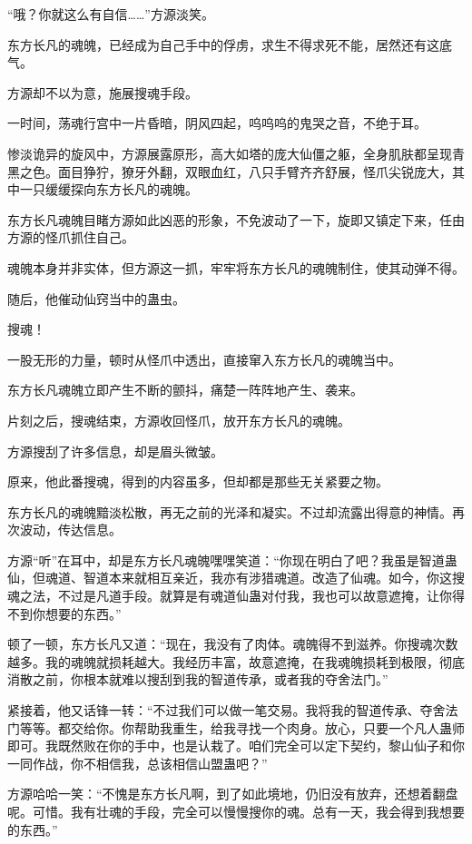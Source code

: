 
\begin{this_body}

“哦？你就这么有自信……”方源淡笑。

东方长凡的魂魄，已经成为自己手中的俘虏，求生不得求死不能，居然还有这底气。

方源却不以为意，施展搜魂手段。

一时间，荡魂行宫中一片昏暗，阴风四起，呜呜呜的鬼哭之音，不绝于耳。

惨淡诡异的旋风中，方源展露原形，高大如塔的庞大仙僵之躯，全身肌肤都呈现青黑之色。面目狰狞，獠牙外翻，双眼血红，八只手臂齐齐舒展，怪爪尖锐庞大，其中一只缓缓探向东方长凡的魂魄。

东方长凡魂魄目睹方源如此凶恶的形象，不免波动了一下，旋即又镇定下来，任由方源的怪爪抓住自己。

魂魄本身并非实体，但方源这一抓，牢牢将东方长凡的魂魄制住，使其动弹不得。

随后，他催动仙窍当中的蛊虫。

搜魂！

一股无形的力量，顿时从怪爪中透出，直接窜入东方长凡的魂魄当中。

东方长凡魂魄立即产生不断的颤抖，痛楚一阵阵地产生、袭来。

片刻之后，搜魂结束，方源收回怪爪，放开东方长凡的魂魄。

方源搜刮了许多信息，却是眉头微皱。

原来，他此番搜魂，得到的内容虽多，但却都是那些无关紧要之物。

东方长凡的魂魄黯淡松散，再无之前的光泽和凝实。不过却流露出得意的神情。再次波动，传达信息。

方源“听”在耳中，却是东方长凡魂魄嘿嘿笑道：“你现在明白了吧？我虽是智道蛊仙，但魂道、智道本来就相互亲近，我亦有涉猎魂道。改造了仙魂。如今，你这搜魂之法，不过是凡道手段。就算是有魂道仙蛊对付我，我也可以故意遮掩，让你得不到你想要的东西。”

顿了一顿，东方长凡又道：“现在，我没有了肉体。魂魄得不到滋养。你搜魂次数越多。我的魂魄就损耗越大。我经历丰富，故意遮掩，在我魂魄损耗到极限，彻底消散之前，你根本就难以搜刮到我的智道传承，或者我的夺舍法门。”

紧接着，他又话锋一转：“不过我们可以做一笔交易。我将我的智道传承、夺舍法门等等。都交给你。你帮助我重生，给我寻找一个肉身。放心，只要一个凡人蛊师即可。我既然败在你的手中，也是认栽了。咱们完全可以定下契约，黎山仙子和你一同作战，你不相信我，总该相信山盟蛊吧？”

方源哈哈一笑：“不愧是东方长凡啊，到了如此境地，仍旧没有放弃，还想着翻盘呢。可惜。我有壮魂的手段，完全可以慢慢搜你的魂。总有一天，我会得到我想要的东西。”


\end{this_body}
